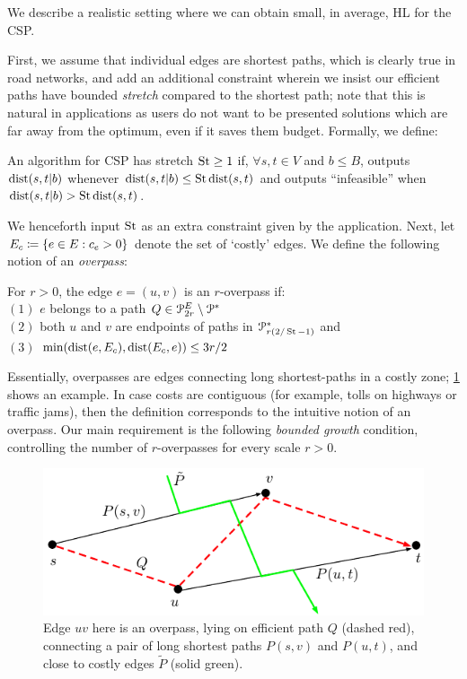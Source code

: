 We describe a realistic setting where we can obtain small, in average, HL for the CSP.

First, we assume that individual edges are shortest paths, which is clearly true in road networks, and add an additional constraint wherein we insist our efficient paths have bounded \emph{stretch} compared to the shortest path; note that this is natural in applications as users do not want to be presented solutions which are far away from the optimum, even if it saves them budget.
Formally, we define:

\begin{definition}[Stretch]
	An algorithm for CSP has stretch $\operatorname{St}\geq 1$ if, $\forall s,t\in V$ and $b\leq B$, outputs $\mbox{dist}(s,t|b)$ whenever $\mbox{dist}(s,t|b)\leq \operatorname{St}\mbox{dist}(s,t)$ and outputs ``infeasible'' when $\mbox{dist}(s,t|b)>\operatorname{St}\mbox{dist}(s,t)$.
\end{definition}
We henceforth input $\operatorname{St}$ as an extra constraint given by the application. 
Next, let $E_c\coloneqq\{e\in E:c_e>0\}$ denote the set of `costly' edges.
We define the following notion of an \emph{overpass}:

\begin{definition}[Overpass]
For $r>0$, the edge $e=(u,v)$ is an $r$-overpass if:\\
$(1)$ $e$ belongs to a path $Q\in\mathcal{P}^E_{2r}\setminus\mathcal{P}^*$\\
$(2)$ both $u$ and $v$ are endpoints of paths in $\mathcal{P}^*_{r(2/\operatorname{St}-1)}$ and\\ 
$(3)$ $\min(\mbox{dist}(e,E_c),\mbox{dist}(E_c,e))\leq 3r/2$
\end{definition} 
Essentially, overpasses are edges connecting long shortest-paths in a costly zone; \cref{fig:overpass} shows an example. In case costs are contiguous (for example, tolls on highways or traffic jams), then the definition corresponds to the intuitive notion of an overpass.
Our main requirement is the following \emph{bounded growth} condition, controlling the number of $r$-overpasses for every scale $r>0$.

\begin{figure}[!b]
	\centering
	\includegraphics[scale=0.7]{TexImg/overpass.pdf}
	\caption{Edge $uv$ here is an overpass, lying on efficient path $Q$ (dashed red), connecting a pair of long shortest paths $P(s,v)$ and $P(u,t)$, and close to costly edges $\tilde P$ (solid green). } 
	\label{fig:overpass}
\end{figure}


